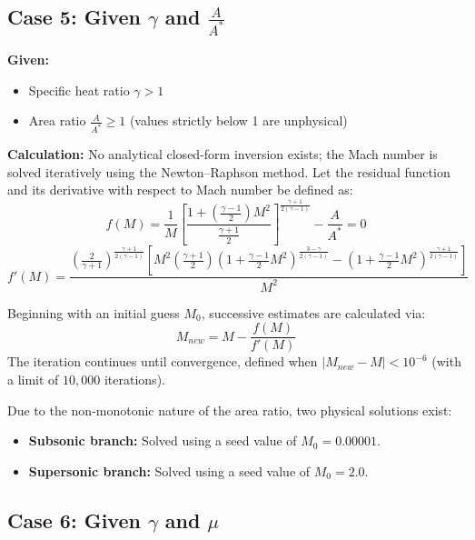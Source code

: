 \subsection*{Case 5: Given $\gamma$ and $\frac{A}{A^*}$}

\textbf{Given:}
\begin{itemize}[nosep]
    \item Specific heat ratio $\gamma > 1$
    \item Area ratio $\frac{A}{A^*} \ge 1$ (values strictly below 1 are unphysical)
\end{itemize}

\textbf{Calculation:} No analytical closed-form inversion exists; the Mach number is solved iteratively using the Newton--Raphson method. Let the residual function and its derivative with respect to Mach number be defined as:
\begin{equation}
f(M) = \frac{1}{M}\left[\frac{1+\left(\frac{\gamma-1}{2}\right)M^2}{\frac{\gamma+1}{2}}\right]^{\frac{\gamma+1}{2(\gamma-1)}} - \frac{A}{A^*} = 0
\end{equation}
\begin{equation}
f'(M) = \frac{\left(\frac{2}{\gamma+1}\right)^{\frac{\gamma+1}{2(\gamma-1)}}\left[M^2\left(\frac{\gamma+1}{2}\right)\left(1+\frac{\gamma-1}{2}M^2\right)^{\frac{3-\gamma}{2(\gamma-1)}} - \left(1+\frac{\gamma-1}{2}M^2\right)^{\frac{\gamma+1}{2(\gamma-1)}}\right]}{M^2}
\end{equation}

Beginning with an initial guess $M_0$, successive estimates are calculated via:
\begin{equation}
M_{new} = M - \frac{f(M)}{f'(M)}
\end{equation}
The iteration continues until convergence, defined when $|M_{new} - M| < 10^{-6}$ (with a limit of $10{,}000$ iterations).

Due to the non-monotonic nature of the area ratio, two physical solutions exist:
\begin{itemize}[nosep]
    \item \textbf{Subsonic branch:} Solved using a seed value of $M_0 = 0.00001$.
    \item \textbf{Supersonic branch:} Solved using a seed value of $M_0 = 2.0$.
\end{itemize}


\subsection*{Case 6: Given $\gamma$ and $\mu$}

